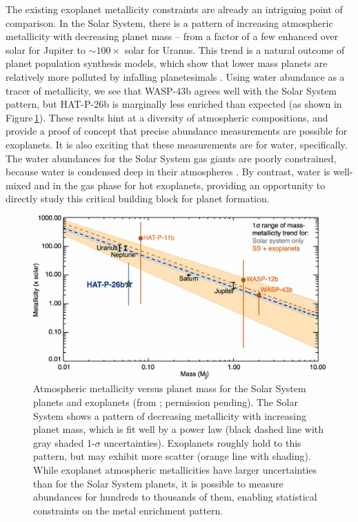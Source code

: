 \documentclass[graybox,natbib,nosecnum]{svmult}
\begin{document}
The existing exoplanet metallicity constraints are already an intriguing point of comparison. In the Solar System, there is a pattern of increasing atmospheric metallicity with decreasing planet mass  -- from a factor of a few enhanced over solar for Jupiter to $\sim100\times$ solar for Uranus. This trend is a natural outcome of planet population synthesis models, which show that lower mass planets are relatively more polluted by infalling planetesimals \citep{fortney13, mordasini16}. Using water abundance as a tracer of metallicity, we see that WASP-43b agrees well with the Solar System pattern, but HAT-P-26b is marginally less enriched than expected (as shown in Figure\,\ref{fig:massZ}).  These results hint at a diversity of atmospheric compositions, and provide a proof of concept that precise abundance measurements are possible for exoplanets. It is also exciting that these measurements are for water, specifically. The water abundances for the Solar System gas giants are poorly constrained, because water is condensed deep in their atmospheres \citep{showman98, mousis14}. By contrast, water is well-mixed and in the gas phase for hot exoplanets, providing an opportunity to directly study this critical building block for planet formation.

 
\begin{figure}
\begin{centering}
\includegraphics[scale=.8]{Figures/fig6_wakeford.jpg}
\caption{Atmospheric metallicity versus planet mass for the Solar System planets and exoplanets (from \citealt{wakeford17}; permission pending). The Solar System shows a pattern of decreasing metallicity with increasing planet mass, which is fit well by a power law (black dashed line with gray shaded 1-$\sigma$ uncertainties). Exoplanets roughly hold to this pattern, but may exhibit more scatter (orange line with shading). While exoplanet atmospheric metallicities have larger uncertainties than for the Solar System planets, it is possible to measure abundances for hundreds to thousands of them, enabling statistical constraints on the metal enrichment pattern.} 
\label{fig:massZ}       
\end{centering}
\end{figure}
\end{document}

